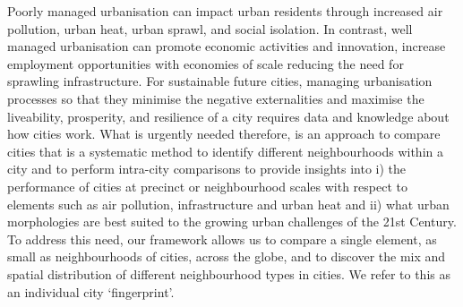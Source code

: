 \documentclass[9pt,twocolumn,twoside,lineno]{pnas-new}
\begin{document}
%
%
%
%
%
%
%
%








Poorly managed urbanisation can impact urban residents through increased air pollution\cite{Stevenson2016,Sallis2016,Landrigan2017}, urban heat\cite{Coutts2012,Bowler2010}, urban sprawl\cite{Frank2000,Bettencourt2010}, and social isolation\cite{Vlahov2002}. In contrast, well managed urbanisation can promote economic activities and innovation, increase employment opportunities with economies of scale reducing the need for sprawling infrastructure\cite{Kuhnert2006,Bettencourt2007,Lobo2013}. For sustainable future cities, managing urbanisation processes so that they minimise the negative externalities and maximise the liveability, prosperity, and resilience of a city requires data and knowledge about how cities work. What is urgently needed therefore, is an approach to compare cities that is a systematic method to identify different neighbourhoods within a city and to perform intra-city comparisons\cite{Louf2014a} to provide insights into i) the performance of cities at precinct or neighbourhood scales with respect to elements such as air pollution, infrastructure and urban heat and ii) what urban morphologies are best suited to the growing urban challenges of the 21st Century. To address this need, our framework allows us to compare a single element, as small as neighbourhoods of cities, across the globe, and to discover the mix and spatial distribution of different neighbourhood types in cities. We refer to this as an individual city `fingerprint'.
\end{document}
